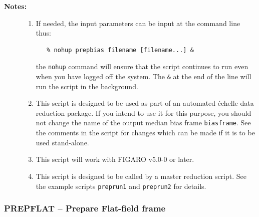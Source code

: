 \documentclass[twoside,11pt]{article}
\newcommand{\stardocinitials}  {SC}
\newcommand{\stardocnumber}    {3.2-0} %
\newcommand{\stardocname}{\stardocinitials /\stardocnumber}
\newcommand{\htmlref}[2]{#1}
\newcommand{\xref}[3]{#1}
\newcommand{\xlabel}[1]{}
\renewcommand{\_}{\texttt{\symbol{95}}}
\newcommand{\scspec}[2]{#1}
\newcommand{\scspec}[2]{#2}
\begin{document}
\begin{description}
\item [{\bf Notes:}] \mbox{}
\begin{enumerate}

\item If needed, the input parameters can be input at the command
      line thus:

\begin{verbatim}
   % nohup prepbias filename [filename...] &
\end{verbatim}

      the \verb+nohup+ command will ensure that the script continues
      to run even when you have logged off the system.  The \verb+&+ at
      the end of the line will run the script in the background.

\item This script is designed to be used as part of an automated
      \'{e}chelle data reduction package.  If you intend to use it
      for this purpose, you should not change the name of the output
      median bias frame \verb+biasframe+.  See the comments in the script
      for changes which can be made if it is to be used stand-alone.

\item This script will work with \xref{FIGARO}{sun86}{} v5.0-0 or later.

\item This script is designed to be called by a master reduction
      script.  See the example scripts \htmlref{\texttt{preprun1}}
      {se_preprun}
      and \htmlref{\texttt{preprun2}}{se_preprun} for details.

\end{enumerate}

\end{description}


\newpage
\subsubsection{\label{se_prepflat}\xlabel{prepflat}PREPFLAT
               \scspec{--}{-} Prepare Flat-field frame}
\markboth{PREPFLAT}{\stardocname}
\end{document}
